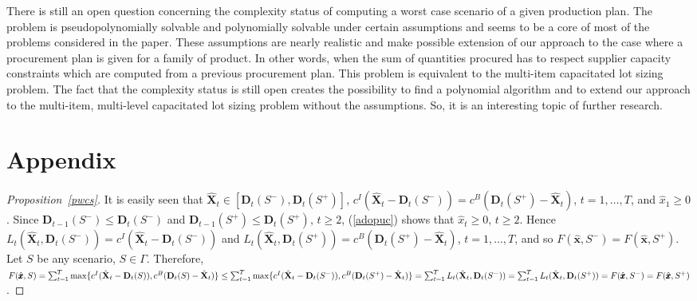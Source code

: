 \documentclass[11pt]{article}
\begin{document}
There is still  an open question concerning 
the complexity status of computing a worst case scenario
of a given production plan.
The problem
 is pseudopolynomially  solvable and polynomially solvable under certain assumptions and
seems to be
a core  of  most of the problems considered in the paper.
These assumptions are nearly realistic and  make possible 
extension of our approach to 
the case where a
procurement plan is given for a family of product.
In other words, when the sum of quantities
procured has to respect  supplier capacity constraints  which are computed from a previous
procurement plan. This problem  is equivalent to the multi-item capacitated lot sizing problem.
The fact that the complexity status is still open
 creates the possibility
 to find a polynomial algorithm
and to  extend our approach to the multi-item, multi-level capacitated lot sizing problem without
the assumptions.
So, it is 
an interesting topic of further
research.






\appendix

\section{Appendix}
\label{dod}


\begin{proof}[Proposition~\ref{pwcs}] 
It is easily seen that 
$\hat{\mathbf{X}}_t \in  [\mathbf{D}_t(S^{-}),\mathbf{D}_t(S^{+})]$,
$c^{I}(\hat{\mathbf{X}}_t-\mathbf{D}_t(S^{-}))=
c^{B}(\mathbf{D}_t(S^{+})-\hat{\mathbf{X}}_t)$, $t=1,\ldots,T$, and $\hat{x}_1\geq 0$.
Since $\mathbf{D}_{t-1}(S^{-})\leq \mathbf{D}_{t}(S^{-})$ and 
$\mathbf{D}_{t-1}(S^{+})\leq \mathbf{D}_{t}(S^{+})$, $t\geq 2$,
 (\ref{adopuc})
shows that $\hat{x}_t\geq 0$, $t\geq 2$.
Hence
$L_t(\hat{\mathbf{X}}_t,\mathbf{D}_t(S^{-}))=c^{I}(\hat{\mathbf{X}}_t-\mathbf{D}_t(S^{-}))$
and 
$L_t(\hat{\mathbf{X}}_t,\mathbf{D}_t(S^{+}))=c^{B}(\mathbf{D}_t(S^{+})-\hat{\mathbf{X}}_t)$, 
$t=1,\ldots,T$, and so $F(\hat{\pmb{x}},S^{-})=F(\hat{\pmb{x}},S^{+})$.
Let $S$ be any scenario, $S\in\Gamma$.  
Therefore,
$F(\hat{\pmb{x}},S)=\sum_{t=1}^{T}\max\{c^{I}(\hat{\mathbf{X}}_t-\mathbf{D}_t(S)),
c^{B}(\mathbf{D}_t(S)-\hat{\mathbf{X}}_t)\}
\leq\sum_{t=1}^{T}\max\{c^{I}(\hat{\mathbf{X}}_t-\mathbf{D}_t(S^{-})),
c^{B}(\mathbf{D}_t(S^{+})-\hat{\mathbf{X}}_t)\}
=\sum_{t=1}^{T}L_t(\hat{\mathbf{X}}_t,\mathbf{D}_t(S^{-}))=
\sum_{t=1}^{T}L_t(\hat{\mathbf{X}}_t,\mathbf{D}_t(S^{+}))\\
=F(\hat{\pmb{x}},S^{-})=F(\hat{\pmb{x}},S^{+})$.
\end{proof}
\end{document}
